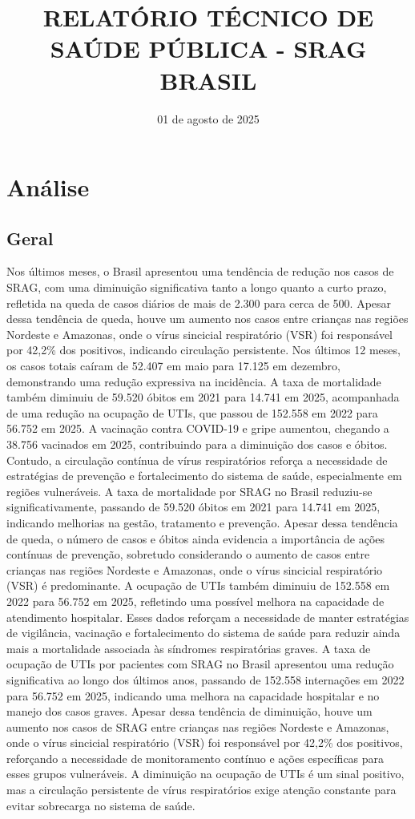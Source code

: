 \documentclass{article}%
\title{\textbf{RELATÓRIO TÉCNICO DE SAÚDE PÚBLICA - SRAG BRASIL}}%
\date{01 de agosto de 2025}%
\begin{document}
%
\normalsize%
\maketitle%
\section{Análise}%
\label{sec:Anlise}%
\subsection{Geral}%
\label{subsec:Geral}%
Nos últimos meses, o Brasil apresentou uma tendência de redução nos casos de SRAG, com uma diminuição significativa tanto a longo quanto a curto prazo, refletida na queda de casos diários de mais de 2.300 para cerca de 500. Apesar dessa tendência de queda, houve um aumento nos casos entre crianças nas regiões Nordeste e Amazonas, onde o vírus sincicial respiratório (VSR) foi responsável por 42,2\% dos positivos, indicando circulação persistente. Nos últimos 12 meses, os casos totais caíram de 52.407 em maio para 17.125 em dezembro, demonstrando uma redução expressiva na incidência. A taxa de mortalidade também diminuiu de 59.520 óbitos em 2021 para 14.741 em 2025, acompanhada de uma redução na ocupação de UTIs, que passou de 152.558 em 2022 para 56.752 em 2025. A vacinação contra COVID{-}19 e gripe aumentou, chegando a 38.756 vacinados em 2025, contribuindo para a diminuição dos casos e óbitos. Contudo, a circulação contínua de vírus respiratórios reforça a necessidade de estratégias de prevenção e fortalecimento do sistema de saúde, especialmente em regiões vulneráveis.\newline%
%
A taxa de mortalidade por SRAG no Brasil reduziu{-}se significativamente, passando de 59.520 óbitos em 2021 para 14.741 em 2025, indicando melhorias na gestão, tratamento e prevenção. Apesar dessa tendência de queda, o número de casos e óbitos ainda evidencia a importância de ações contínuas de prevenção, sobretudo considerando o aumento de casos entre crianças nas regiões Nordeste e Amazonas, onde o vírus sincicial respiratório (VSR) é predominante. A ocupação de UTIs também diminuiu de 152.558 em 2022 para 56.752 em 2025, refletindo uma possível melhora na capacidade de atendimento hospitalar. Esses dados reforçam a necessidade de manter estratégias de vigilância, vacinação e fortalecimento do sistema de saúde para reduzir ainda mais a mortalidade associada às síndromes respiratórias graves.\newline%
%
A taxa de ocupação de UTIs por pacientes com SRAG no Brasil apresentou uma redução significativa ao longo dos últimos anos, passando de 152.558 internações em 2022 para 56.752 em 2025, indicando uma melhora na capacidade hospitalar e no manejo dos casos graves. Apesar dessa tendência de diminuição, houve um aumento nos casos de SRAG entre crianças nas regiões Nordeste e Amazonas, onde o vírus sincicial respiratório (VSR) foi responsável por 42,2\% dos positivos, reforçando a necessidade de monitoramento contínuo e ações específicas para esses grupos vulneráveis. A diminuição na ocupação de UTIs é um sinal positivo, mas a circulação persistente de vírus respiratórios exige atenção constante para evitar sobrecarga no sistema de saúde.\newline%
\end{document}
